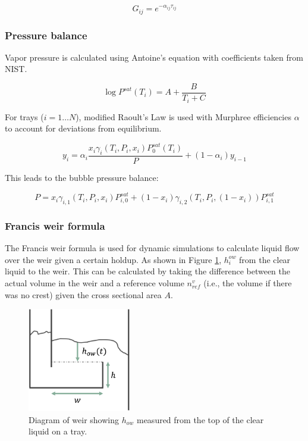 \begin{equation}
    G_{ij} = e^{-\alpha_{ij} \tau_{ij}}
\end{equation}

\subsubsection{Pressure balance}

Vapor pressure is calculated using Antoine’s equation with coefficients taken from NIST. 

\begin{equation}
    \log P^{sat}(T_i) = A + \frac{B}{T_i + C}
\end{equation}

For trays ($i=1\dots N$), modified Raoult’s Law is used with Murphree efficiencies $\alpha$ to account for deviations from equilibrium.

\begin{equation}
    y_i = \alpha_i\frac{x_i\gamma_i(T_i, P_i, x_i)P_0^{sat}(T_i)}{P} + (1-\alpha_i)y_{i-1}
\end{equation}

This leads to the bubble pressure balance:

\begin{equation}
    P = x_i\gamma_{i,1}(T_i, P_i, x_i)P^{sat}_{i,0} + (1-x_i)\gamma_{i,2}(T_i, P_i, (1-x_i))P^{sat}_{i,1}
\end{equation}

\subsubsection{Francis weir formula}\label{sec:francis_weir}

The Francis weir formula is used for dynamic simulations to calculate liquid flow over the weir given a certain holdup. As shown in Figure \ref{fig:weir}, $h_i^{ow}$ from the clear liquid to the weir. This can be calculated by taking the difference between the actual volume in the weir and a reference volume $n^v_{ref}$ (i.e., the volume if there was no crest) given the cross sectional area $A$.

\begin{figure}
    \centering
    \includegraphics[width=0.4\textwidth]{gfx/Chapter06/weir.png}
    \caption{Diagram of weir showing $h_{ow}$ measured from the top of the clear liquid on a tray.}
    \label{fig:weir}
\end{figure}


